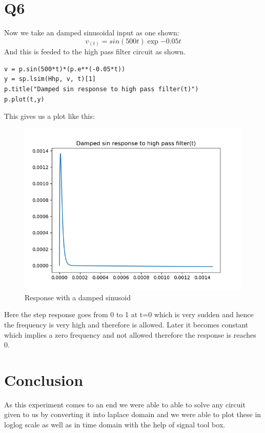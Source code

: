 \documentclass[12pt, a4paper]{report}
\begin{document}
\section*{Q6}
Now we take an damped sinusoidal input as one shown:
 \begin{equation}
v_(t) = sin(500t)\exp{-0.05t}
 \end{equation}
And this is feeded to the high pass filter circuit as shown.
\begin{verbatim}
v = p.sin(500*t)*(p.e**(-0.05*t))
y = sp.lsim(Hhp, v, t)[1] 
p.title("Damped sin response to high pass filter(t)") 
p.plot(t,y)
\end{verbatim}
This gives us a plot like this:
  \begin{figure}
	\centering
	\includegraphics[scale=0.8]{figure_8..png}  %
	\caption{Response with a damped sinusoid}
	\label{fig:8}
\end{figure}
Here the step response goes from 0 to 1 at t=0 which is very sudden and hence the frequency is very high and therefore is allowed. Later it becomes constant which implies a zero frequency and not allowed therefore the response is reaches 0.

\section*{Conclusion}
As this experiment comes to an end we were able to able to solve any circuit given to us by converting it into laplace domain and we were able to plot these in loglog scale as well as in time domain with the help of signal tool box.
\end{document}
